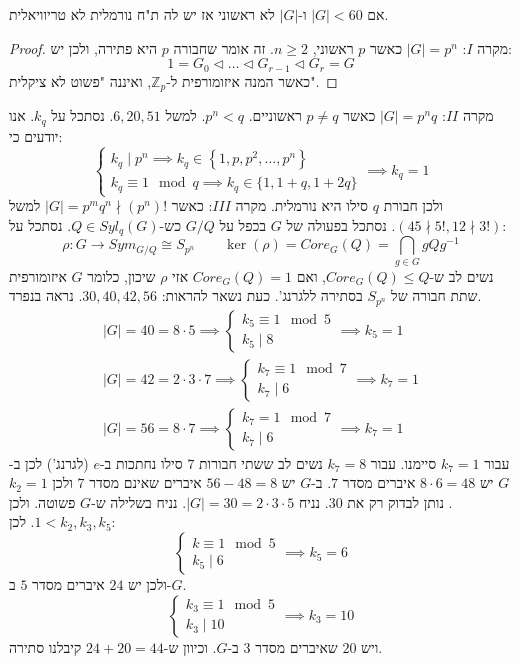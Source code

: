 \documentclass{tstextbook}
\begin{document}
\begin{proposition}
אם \(|G|<60\) ו-\(|G|\) לא ראשוני אז יש לה ת"ח נורמלית לא טריוויאלית.

\end{proposition}
\begin{proof}
מקרה \(I\): \(|G|=p^n\) כאשר \(p\) ראשוני, \(n\geq 2\). זה אומר שחבורה \(p\) היא פתירה, ולכן יש:
$$1=G_{0}\triangleleft \dots \triangleleft G_{r-1}\triangleleft G_{r}=G$$
כאשר המנה איזומורפית ל-\(\mathbb{Z} _p\), ואיננה "פשוט לא ציקלית".

\end{proof}
מקרה \(II\): \(|G|=p^nq\) כאשר \(p\neq q\) ראשוניים. \(p^n<q\). למשל \(6,20,51\). נסתכל על \(k_{q}\). אנו יודעים כי: 
$$\begin{cases}k_{q}\mid p^n\implies k_{q}\in \left\{  1,p,p^2,\dots,p^n  \right\} \\k_{q}\equiv 1\mod q \implies k_{q}\in \{1, 1+q, 1+2q  \}
\end{cases}\implies k_{q}=1$$
ולכן חבורת \(q\) סילו היא נורמלית.
מקרה \(III\): כאשר \(|G|=p^mq^n \nmid(p^n)!\) למשל \(\left( 45\nmid 5!, 12\nmid 3! \right)\). נסתכל בפעולה של \(G\) בכפל על \(G / Q\) כש-\(Q\in Syl_{q}(G)\). נסתכל על:
$$\rho:G\to Sym_{G / Q}\cong S_{p^n}\qquad \ker\left( \rho \right)=Core_{G}(Q)=\bigcap_{g\in G}gQg^{-1}$$
נשים לב ש-\(Core_{G}(Q)\leq Q\), ואם \(Core_{G}(Q)=1\) אזי \(\rho\) שיכון, כלומר \(G\) איזומורפית שתת חבורה של \(S_{p^n}\) בסתירה ללגרנג'.
כעת נשאר להראות: \(30,40,42,56\). נראה בנפרד.
\begin{gather*}|G|=40=8\cdot 5\implies \begin{cases}k_{5}\equiv 1 \mod 5\\k_{5}\mid 8\end{cases}\implies k_{5}=1\\|G|=42=2\cdot 3\cdot 7\implies \begin{cases}k_{7} \equiv 1 \mod 7 \\k_{7} \mid 6\end{cases}\implies k_{7}=1\\|G|=56=8\cdot 7\implies \begin{cases}k_{7}=1 \mod 7 \\k_{7} \mid 6\end{cases}\implies k_{7}=1 
\end{gather*}
עבור \(k_{7}=1\) סיימנו. עבור \(k_{7}=8\) נשים לב ששתי חבורות \(7\) סילו נחתכות ב-\(e\) (לגרנג') לכן ב-\(G\) יש \(8\cdot 6=48\) איברים מסדר \(7\). ב-\(G\) יש \(56-48=8\) איברים שאינם מסדר \(7\) ולכן \(k_{2}=1\). נותן לבדוק רק את \(30\). נניח \(|G|=30=2\cdot 3\cdot 5\). נניח בשלילה ש-\(G\) פשוטה. ולכן \(1<k_{2},k_{3},k_{5}\). לכן: 
$$\begin{cases}k \equiv 1 \mod 5 \\k_{5} \mid 6
\end{cases}\implies k_{5}=6$$
ולכן יש \(24\) איברים מסדר \(5\) ב-\(G\).
$$\begin{cases}  k_{3} \equiv 1 \mod 5\\k_{3}\mid 10  
\end{cases}\implies k_{3}=10$$
ויש \(20\) שאיברים מסדר \(3\) ב-\(G\). וכיוון ש-\(24+20=44\) קיבלנו סתירה.
\end{document}

